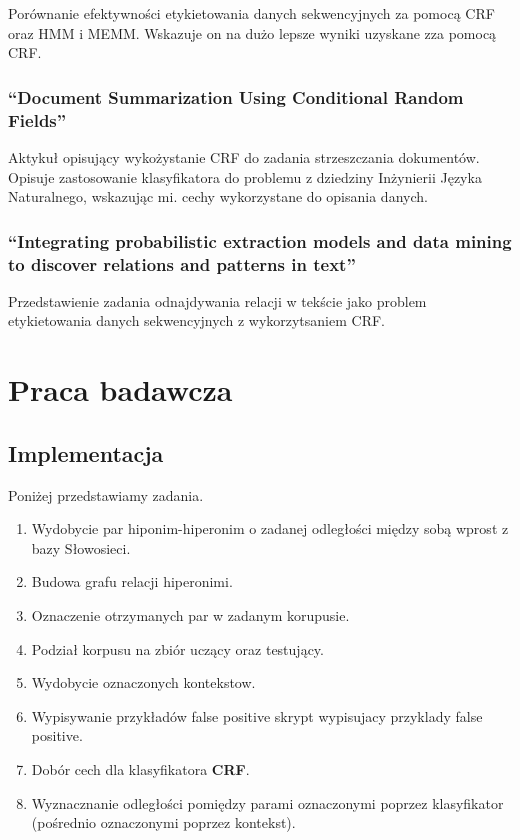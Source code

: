 \documentclass[a4paper,10pt]{report}
\begin{document}
Porównanie efektywności etykietowania danych sekwencyjnych za pomocą CRF oraz HMM i MEMM. Wskazuje on na dużo lepsze wyniki uzyskane zza pomocą CRF. 

\subsection{``Document Summarization Using Conditional Random Fields''\cite{shen2007doccum}}

Aktykuł opisujący wykożystanie CRF do zadania strzeszczania dokumentów.
Opisuje zastosowanie klasyfikatora do problemu z dziedziny Inżynierii Języka Naturalnego, wskazując mi. cechy wykorzystane do opisania danych.  

\subsection{``Integrating probabilistic extraction models and data mining to discover relations and patterns in text''\cite{culotta2006integrating}}

Przedstawienie zadania odnajdywania relacji w tekście jako problem etykietowania danych sekwencyjnych z wykorzytsaniem CRF.


\chapter{Praca badawcza}

\section{Implementacja}

\noindent Poniżej przedstawiamy zadania.
\begin{enumerate}
 \item Wydobycie par hiponim-hiperonim o zadanej odległości między sobą wprost z bazy Słowosieci. %
 \item Budowa grafu relacji hiperonimi. %
 \item Oznaczenie otrzymanych par w zadanym korupusie. %
 \item Podział korpusu na zbiór uczący oraz testujący. %
 \item Wydobycie oznaczonych kontekstow. %
 \item Wypisywanie przykładów false positive skrypt wypisujacy przyklady false positive.
 \item Dobór cech dla klasyfikatora \textbf{CRF}.  %
 
 \item Wyznacznanie odległości pomiędzy parami oznaczonymi poprzez klasyfikator (pośrednio oznaczonymi poprzez kontekst).  %
\end{enumerate}
\end{document}
